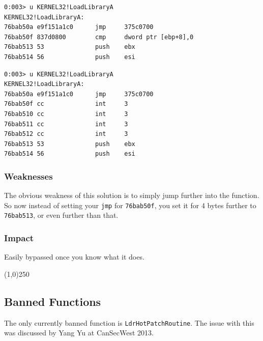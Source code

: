 \documentclass[]{article}
\newcommand{\sectionbreakline}[0]{\begin{center}\line(1,0){250}\end{center}}
\begin{document}
\begin{minipage}[t]{\textwidth}
\centering
\begin{verbatim}
0:003> u KERNEL32!LoadLibraryA
KERNEL32!LoadLibraryA:
76bab50a e9f151a1c0      jmp     375c0700
76bab50f 837d0800        cmp     dword ptr [ebp+8],0
76bab513 53              push    ebx
76bab514 56              push    esi
\end{verbatim}
  \label{fig:hooked}
\end{minipage}

\begin{minipage}[t]{\textwidth}
\centering
\begin{verbatim}
0:003> u KERNEL32!LoadLibraryA
KERNEL32!LoadLibraryA:
76bab50a e9f151a1c0      jmp     375c0700
76bab50f cc              int     3
76bab510 cc              int     3
76bab511 cc              int     3
76bab512 cc              int     3
76bab513 53              push    ebx
76bab514 56              push    esi
\end{verbatim}
\label{fig:antidetour}
\end{minipage}%

\subsubsection{Weaknesses}
The obvious weakness of this solution is to simply jump further into the function.  So now instead of setting your \texttt{jmp} for \texttt{76bab50f}, you set it for 4 bytes further to \texttt{76bab513}, or even further than that.

\subsubsection{Impact}
Easily bypassed once you know what it does.

\sectionbreakline{}








\subsection{Banned Functions}\label{banned-functions}
The only currently banned function is \texttt{LdrHotPatchRoutine}.  The issue with this was discussed by Yang Yu at CanSecWest 2013\cite{LdrHotPatchRoutine}.
\end{document}
